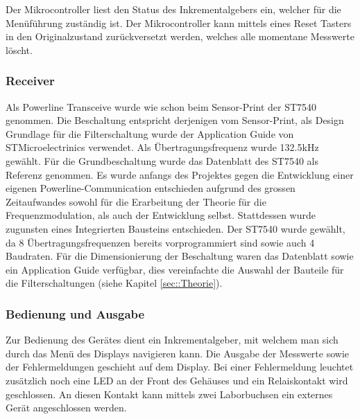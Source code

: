 Der Mikrocontroller liest den Status des Inkrementalgebers ein, welcher für die Menüführung zuständig ist. Der Mikrocontroller kann mittels eines Reset Tasters in den Originalzustand zurückversetzt werden, welches alle momentane Messwerte löscht.

\subsubsection{Receiver}
Als Powerline Transceive wurde wie schon beim Sensor-Print der ST7540 genommen. Die Beschaltung entspricht derjenigen vom Sensor-Print, als Design Grundlage für die Filterschaltung wurde der Application Guide \cite[p. 48]{Applic_Guide_ST7540} von STMicroelectrinics verwendet. Als Übertragungsfrequenz wurde 132.5kHz gewählt. Für die Grundbeschaltung wurde das Datenblatt des ST7540 \cite[p. 40]{Datasheet_ST7540} als Referenz genommen.
Es wurde anfangs des Projektes gegen die Entwicklung einer eigenen Powerline-Communication entschieden aufgrund des grossen Zeitaufwandes sowohl für die Erarbeitung der Theorie für die Frequenzmodulation, als auch der Entwicklung selbst. Stattdessen wurde zugunsten eines Integrierten Bausteins entschieden. Der ST7540 wurde gewählt, da 8 Übertragungsfrequenzen bereits vorprogrammiert sind sowie auch 4 Baudraten. Für die Dimensionierung der Beschaltung waren das Datenblatt \cite{Datasheet_ST7540} sowie ein Application Guide \cite{Applic_Guide_ST7540} verfügbar, dies vereinfachte die Auswahl der Bauteile für die Filterschaltungen (siehe Kapitel \ref{sec::Theorie}).

\subsubsection{Bedienung und Ausgabe}
Zur Bedienung des Gerätes dient ein Inkrementalgeber, mit welchem man sich durch das Menü des Displays navigieren kann. Die Ausgabe der Messwerte sowie der Fehlermeldungen geschieht auf dem Display. Bei einer Fehlermeldung leuchtet zusätzlich noch eine LED an der Front des Gehäuses und ein Relaiskontakt wird geschlossen. An diesen Kontakt kann mittels zwei Laborbuchsen ein externes Gerät angeschlossen werden.

